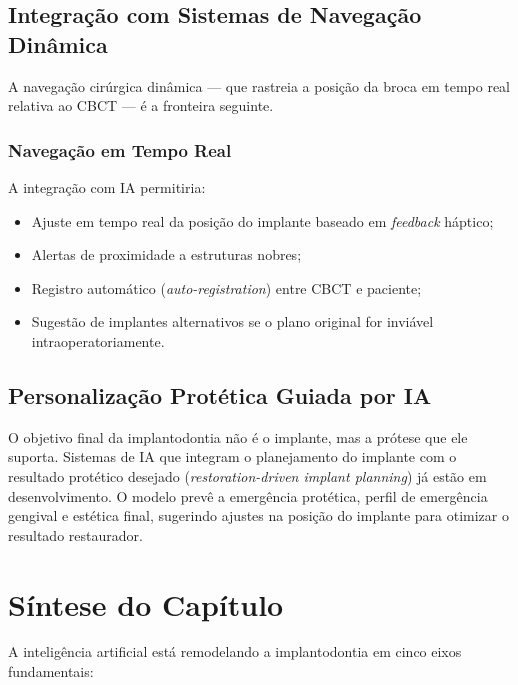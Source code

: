 \subsection{Integração com Sistemas de Navegação Dinâmica}

A navegação cirúrgica dinâmica --- que rastreia a posição da broca em tempo real relativa ao CBCT --- é a fronteira seguinte.

\subsubsection{Navegação em Tempo Real}

A integração com IA permitiria:
\begin{itemize}
    \item Ajuste em tempo real da posição do implante baseado em \textit{feedback} háptico;
    \item Alertas de proximidade a estruturas nobres;
    \item Registro automático (\textit{auto-registration}) entre CBCT e paciente;
    \item Sugestão de implantes alternativos se o plano original for inviável intraoperatoriamente.
\end{itemize}

\subsection{Personalização Protética Guiada por IA}

O objetivo final da implantodontia não é o implante, mas a prótese que ele suporta. Sistemas de IA que integram o planejamento do implante com o resultado protético desejado (\textit{restoration-driven implant planning}) já estão em desenvolvimento. O modelo prevê a emergência protética, perfil de emergência gengival e estética final, sugerindo ajustes na posição do implante para otimizar o resultado restaurador.

\section{Síntese do Capítulo}

A inteligência artificial está remodelando a implantodontia em cinco eixos fundamentais:

